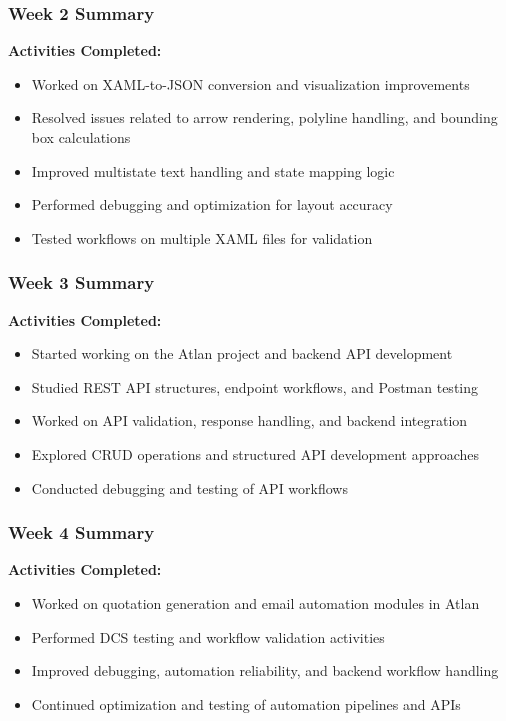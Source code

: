\documentclass[12pt,a4paper]{report}
\begin{document}
\subsubsection*{Week 2 Summary}
\textbf{Activities Completed:}
\begin{itemize}[leftmargin=1.5cm]
    \item Worked on XAML-to-JSON conversion and visualization improvements
    \item Resolved issues related to arrow rendering, polyline handling, and bounding box calculations
    \item Improved multistate text handling and state mapping logic
    \item Performed debugging and optimization for layout accuracy
    \item Tested workflows on multiple XAML files for validation
\end{itemize}

\subsubsection*{Week 3 Summary}
\textbf{Activities Completed:}
\begin{itemize}[leftmargin=1.5cm]
    \item Started working on the Atlan project and backend API development
    \item Studied REST API structures, endpoint workflows, and Postman testing
    \item Worked on API validation, response handling, and backend integration
    \item Explored CRUD operations and structured API development approaches
    \item Conducted debugging and testing of API workflows
\end{itemize}

\subsubsection*{Week 4 Summary}
\textbf{Activities Completed:}
\begin{itemize}[leftmargin=1.5cm]
    \item Worked on quotation generation and email automation modules in Atlan
    \item Performed DCS testing and workflow validation activities
    \item Improved debugging, automation reliability, and backend workflow handling
    \item Continued optimization and testing of automation pipelines and APIs
\end{itemize}
\end{document}
